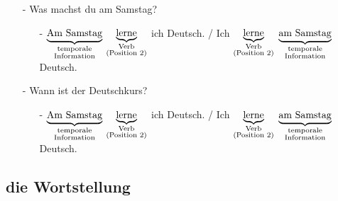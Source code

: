             \begin{itemize}[topsep=0pt,itemsep=4pt,parsep=0pt]
                \item[-] Was machst du am Samstag? 
                    \begin{itemize}
                        \item[-]  $\underbrace{\text{Am Samstag}}_{\substack{\text{\scriptsize temporale} \\ \text{\scriptsize Information}}}$ $\underbrace{\text{lerne}}_{\substack{\text{\scriptsize Verb} \\ \text{\scriptsize (Position 2)}}}$ ich Deutsch. / Ich $\underbrace{\text{lerne}}_{\substack{\text{\scriptsize Verb} \\ \text{\scriptsize (Position 2)}}}$ $\underbrace{\text{am Samstag}}_{\substack{\text{\scriptsize temporale} \\ \text{\scriptsize Information}}}$ Deutsch.
                    \end{itemize}
                \item[-] Wann ist der Deutschkurs? 
                    \begin{itemize}
                        \item[-]  $\underbrace{\text{Am Samstag}}_{\substack{\text{\scriptsize temporale} \\ \text{\scriptsize Information}}}$ $\underbrace{\text{lerne}}_{\substack{\text{\scriptsize Verb} \\ \text{\scriptsize (Position 2)}}}$ ich Deutsch. / Ich $\underbrace{\text{lerne}}_{\substack{\text{\scriptsize Verb} \\ \text{\scriptsize (Position 2)}}}$ $\underbrace{\text{am Samstag}}_{\substack{\text{\scriptsize temporale} \\ \text{\scriptsize Information}}}$ Deutsch.
                    \end{itemize}
            \end{itemize}

    \subsection{die Wortstellung}\label{subsection:deutsch:wortstellung}

    
